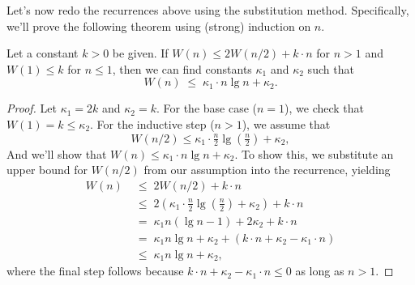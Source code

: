 \begin{cluster}
\label{grp:grm:mcss::solving-the-recurrence-using-substitution-method}

\begin{gram}
\label{grm:mcss::solving-the-recurrence-using-substitution-method}
Let's now redo the recurrences above using the substitution method.
Specifically, we'll prove the following theorem using (strong)
induction on $n$.

\end{gram}
\end{cluster}

\begin{flex}
\label{grp:thm:mcss::constant}

\begin{theorem}
\label{thm:mcss::constant}
  Let a constant $k > 0$ be given.  If $W(n) \leq 2 W(n/2) + k \cdot n$ for $n >
  1$ and $W(1) \leq k$ for $n \leq 1$, then we can find constants $\kappa_1$ and
  $\kappa_2$ such that \[ W(n) \;\leq\; \kappa_1 \cdot n \lg n + \kappa_2.\]

\end{theorem}

\begin{proof}
\label{prf:mcss::assume}
  Let $\kappa_1 = 2k$ and $\kappa_2 = k$.  For the base case ($n=1$), we check
  that $W(1) = k \leq \kappa_2$.  For the inductive step ($n>1$), we assume that
  \[
  W(n/2) \leq \kappa_1 \cdot \tfrac{n}2 \lg (\tfrac{n}2) + \kappa_2,
  \]
  And we'll show that $W(n) \leq \kappa_1 \cdot n \lg n + \kappa_2$.  To show
  this, we substitute an upper bound for $W(n/2)$ from our assumption into the
  recurrence, yielding
  \[ \begin{align*}
    W(n) \;&\leq\; 2W(n/2) + k \cdot n  \\
    \;&\leq\; 2(\kappa_1 \cdot \tfrac{n}2 \lg (\tfrac{n}2) + \kappa_2) + k \cdot n\\
    \;&=\; \kappa_1 n (\lg n - 1) + 2 \kappa_2 + k \cdot n\\
    \;&=\; \kappa_1 n \lg n + \kappa_2 + (k \cdot n + \kappa_2 - \kappa_1 \cdot n)\\
    \;&\leq\; \kappa_1 n \lg n + \kappa_2,
  \end{align*} \]
  where the final step follows because $k \cdot n + \kappa_2 - \kappa_1 \cdot n \leq
  0$ as long as $n > 1$.

\end{proof}
\end{flex}

